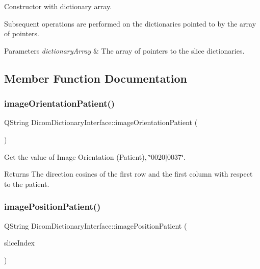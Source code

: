 Constructor with dictionary array. 

Subsequent operations are performed on the dictionaries pointed to by the array of pointers. 
\begin{DoxyParams}{Parameters}
{\em dictionary\+Array} & The array of pointers to the slice dictionaries. \\
\hline
\end{DoxyParams}


\subsection{Member Function Documentation}
\mbox{\label{class_dicom_dictionary_interface_a6dc83ae90c17a9fcf28c9d18f1f0aec8}} 
\subsubsection{\texorpdfstring{image\+Orientation\+Patient()}{imageOrientationPatient()}}
{\footnotesize\ttfamily Q\+String Dicom\+Dictionary\+Interface\+::image\+Orientation\+Patient (\begin{DoxyParamCaption}{ }\end{DoxyParamCaption})}



Get the value of Image Orientation (Patient), \char`\"{}0020$\vert$0037\char`\"{}. 

\begin{DoxyReturn}{Returns}
The direction cosines of the first row and the first column with respect to the patient. 
\end{DoxyReturn}
\mbox{\label{class_dicom_dictionary_interface_a0f0cd4f426726af6a6e0ba9d4a4412d0}} 
\subsubsection{\texorpdfstring{image\+Position\+Patient()}{imagePositionPatient()}}
{\footnotesize\ttfamily Q\+String Dicom\+Dictionary\+Interface\+::image\+Position\+Patient (\begin{DoxyParamCaption}\item[{\hyperlink{class_dicom_dictionary_interface_a4fde43e0647ab57f29eb2c59c3d051ca}{Dicom\+Dictionary\+Interface\+::\+Size\+Type}}]{slice\+Index }\end{DoxyParamCaption})}



